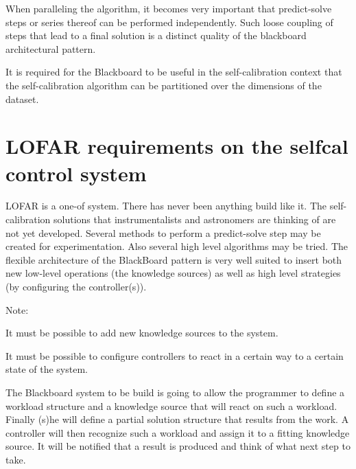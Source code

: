 \documentclass[]{lofar}
\begin{document}
    When paralleling the algorithm, it becomes very important that
    predict-solve steps or series thereof can be performed
    independently. Such loose coupling of steps that lead to a final
    solution is a distinct quality of the blackboard architectural
    pattern.

    \begin{em}

      It is required for the Blackboard to be useful in the
      self-calibration context that the self-calibration algorithm can
      be partitioned over the dimensions of the dataset.

    \end{em}

  \section{LOFAR requirements on the selfcal control system}
  \label{section-LOFAR-requirements}\hypertarget{section-LOFAR-requirements}{}%

    LOFAR is a one-of system. There has never been anything build like
    it. The self-calibration solutions that instrumentalists and
    astronomers are thinking of are not yet developed. Several methods
    to perform a predict-solve step may be created for
    experimentation. Also several high level algorithms may be
    tried. The flexible architecture of the BlackBoard pattern is very
    well suited to insert both new low-level operations (the knowledge
    sources) as well as high level strategies (by configuring the
    controller(s)).

    \begin{em}\large{Note: }

      It must be possible to add new knowledge sources to the system.

      It must be possible to configure controllers to react in a
      certain way to a certain state of the system.

    \end{em}

    The Blackboard system to be build is going to allow the programmer
    to define a workload structure and a knowledge source that will
    react on such a workload. Finally (s)he will define a partial
    solution structure that results from the work. A controller will
    then recognize such a workload and assign it to a fitting
    knowledge source. It will be notified that a result is produced
    and think of what next step to take.
\end{document}
